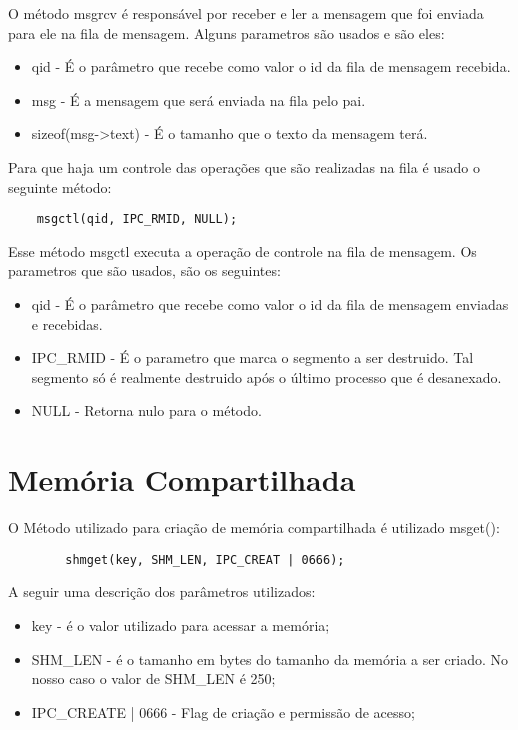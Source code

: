 O método  msgrcv é responsável por receber e ler a mensagem que foi enviada para ele na fila de mensagem. Alguns parametros são usados e são eles:

\begin{itemize}
	\item qid - É o parâmetro que recebe como valor o id da fila de mensagem recebida.
	\item msg - É a mensagem que será enviada na fila pelo pai.
	\item sizeof(msg->text) - É o tamanho que o texto da mensagem terá.
\end{itemize}


Para que haja um controle das operações que são realizadas na fila é usado o seguinte método:
\begin{lstlisting}
	msgctl(qid, IPC_RMID, NULL);
\end{lstlisting}

Esse método msgctl executa a operação de controle na fila de mensagem. Os parametros que são usados, são os seguintes:
\begin{itemize}
	\item qid - É o parâmetro que recebe como valor o id da fila de mensagem enviadas e  recebidas.
	\item IPC\_RMID - É o parametro que marca o segmento a ser destruido. Tal segmento só é realmente destruido após o último processo que é desanexado.
	\item NULL - Retorna nulo para o método.

\end{itemize}

\section{Memória Compartilhada}
O Método utilizado para criação de memória compartilhada é utilizado msget():
	\begin{lstlisting}
		shmget(key, SHM_LEN, IPC_CREAT | 0666);
	\end{lstlisting}
	
A seguir uma descrição dos parâmetros utilizados:
\begin{itemize}
  \item key - é o valor utilizado para acessar a memória;
  \item SHM\_LEN - é o tamanho em bytes do tamanho da memória a ser criado. No nosso caso o valor de SHM\_LEN é 250; 
  \item IPC\_CREATE | 0666 - Flag de criação e permissão de acesso;
\end{itemize}	

